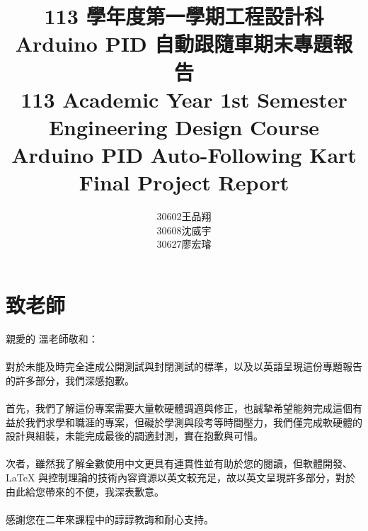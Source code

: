 \documentclass[a4paper,12pt]{./article}
\begin{document}
\title{
\Large 113 學年度第一學期工程設計科\\
\huge Arduino PID 自動跟隨車期末專題報告\\
\Large 113 Academic Year 1st Semester Engineering Design Course\\
\huge Arduino PID Auto-Following Kart Final Project Report
}
\author{30602王品翔\\30608沈威宇\\30627廖宏璿}
\date{\temtoday}
\titletocdoc
\section{致老師}
親愛的 溫老師敬和：\\\\
對於未能及時完全達成公開測試與封閉測試的標準，以及以英語呈現這份專題報告的許多部分，我們深感抱歉。\\\\
首先，我們了解這份專案需要大量軟硬體調適與修正，也誠摯希望能夠完成這個有益於我們求學和職涯的專案，但礙於學測與段考等時間壓力，我們僅完成軟硬體的設計與組裝，未能完成最後的調適封測，實在抱歉與可惜。\\\\
次者，雖然我了解全數使用中文更具有連貫性並有助於您的閱讀，但軟體開發、\LaTeX{} 與控制理論的技術內容資源以英文較充足，故以英文呈現許多部分，對於由此給您帶來的不便，我深表歉意。\\\\
感謝您在二年來課程中的諄諄教誨和耐心支持。
\end{document}
